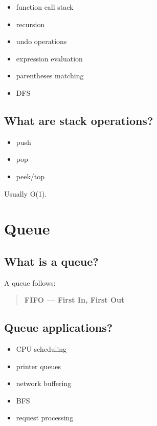 \begin{itemize}
  \item function call stack
  \item recursion
  \item undo operations
  \item expression evaluation
  \item parentheses matching
  \item DFS
\end{itemize}

\medskip

\subsection{What are stack operations?}

\begin{itemize}
  \item push
  \item pop
  \item peek/top
\end{itemize}

Usually O(1).

\medskip

\section{Queue}

\subsection{What is a queue?}

A queue follows:

\begin{quote}
\textbf{FIFO --- First In, First Out}\\
\end{quote}

\medskip

\subsection{Queue applications?}

\begin{itemize}
  \item CPU scheduling
  \item printer queues
  \item network buffering
  \item BFS
  \item request processing
\end{itemize}

